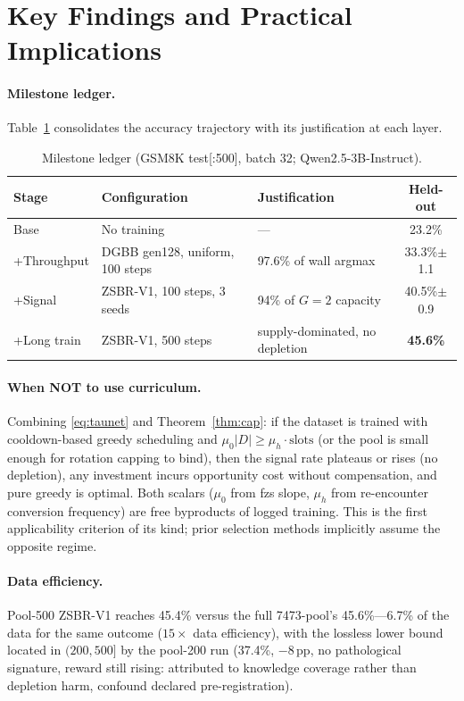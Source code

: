 \documentclass[11pt]{article}
\theoremstyle{definition}
\begin{document}
\section{Key Findings and Practical Implications}\label{sec:find}

\paragraph{Milestone ledger.} Table~\ref{tab:ledger} consolidates the accuracy
trajectory with its justification at each layer.

\begin{table}[t]
\centering\small
\caption{Milestone ledger (GSM8K test[:500], batch 32; Qwen2.5-3B-Instruct).}
\label{tab:ledger}
\begin{tabular}{@{}lllc@{}}
\toprule
Stage & Configuration & Justification & Held-out \\
\midrule
Base & No training & --- & 23.2\% \\
+Throughput & DGBB gen128, uniform, 100 steps & 97.6\% of wall argmax & 33.3\%$\pm$1.1 \\
+Signal & ZSBR-V1, 100 steps, 3 seeds & 94\% of $G{=}2$ capacity & 40.5\%$\pm$0.9 \\
+Long train & ZSBR-V1, 500 steps & supply-dominated, no depletion & \textbf{45.6\%} \\
\bottomrule
\end{tabular}
\end{table}

\paragraph{When NOT to use curriculum.} Combining \eqref{eq:taunet} and
Theorem~\ref{thm:cap}: if the dataset is trained with cooldown-based greedy
scheduling and $\mu_0|D| \ge \mu_h\cdot\text{slots}$ (or the pool is small enough
for rotation capping to bind), then the signal rate plateaus or rises (no
depletion), any investment incurs opportunity cost without compensation, and pure
greedy is optimal. Both scalars ($\mu_0$ from fzs slope, $\mu_h$ from
re-encounter conversion frequency) are free byproducts of logged training. This is
the first applicability criterion of its kind; prior selection methods
implicitly assume the opposite regime.

\paragraph{Data efficiency.} Pool-500 ZSBR-V1 reaches 45.4\% versus the full
7473-pool's 45.6\%---6.7\% of the data for the same outcome ($15\times$ data
efficiency), with the lossless lower bound located in $(200,500]$ by the pool-200
run (37.4\%, $-8$\,pp, no pathological signature, reward still rising: attributed
to knowledge coverage rather than depletion harm, confound declared
pre-registration).
\end{document}
